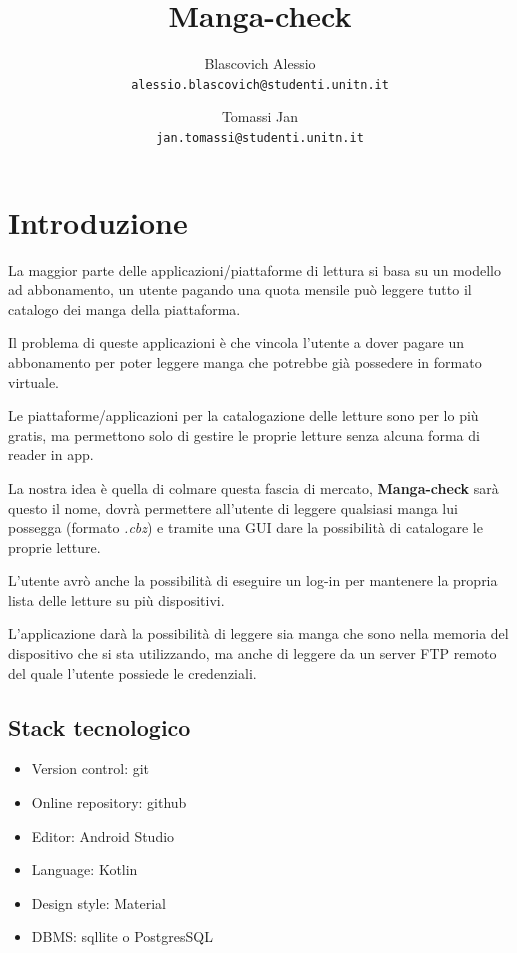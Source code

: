 \documentclass{report}
\title{Manga-check}
\author{Blascovich Alessio\\
	\texttt{alessio.blascovich@studenti.unitn.it}
	\and
	Tomassi Jan\\
	\texttt{jan.tomassi@studenti.unitn.it}
}
\begin{document}
\maketitle

\tableofcontents

\newpage

\chapter{Introduzione}

La maggior parte delle applicazioni/piattaforme di lettura si basa su un
modello ad abbonamento, un utente pagando una quota mensile può leggere
tutto il catalogo dei manga della piattaforma.

Il problema di queste applicazioni è che vincola l'utente a dover pagare
un abbonamento per poter leggere manga che potrebbe già possedere in
formato virtuale.

Le piattaforme/applicazioni per la catalogazione delle letture sono per
lo più gratis, ma permettono solo di gestire le proprie letture senza
alcuna forma di reader in app.

La nostra idea è quella di colmare questa fascia di mercato,
\textbf{Manga-check} sarà questo il nome, dovrà permettere all'utente di
leggere qualsiasi manga lui possegga (formato \emph{.cbz}) e tramite una GUI
dare la possibilità di catalogare le proprie letture.

L'utente avrò anche la possibilità di eseguire un log-in per mantenere
la propria lista delle letture su più dispositivi.

L'applicazione darà la possibilità di leggere sia manga che sono nella
memoria del dispositivo che si sta utilizzando, ma anche di leggere da
un server FTP remoto del quale l'utente possiede le credenziali.

\section{Stack tecnologico}
\begin{itemize}
	\item Version control: git
	\item Online repository: github
	\item Editor: Android Studio
	\item Language: Kotlin
	\item Design style: Material
	\item DBMS: sqllite o PostgresSQL
\end{itemize}
\end{document}
